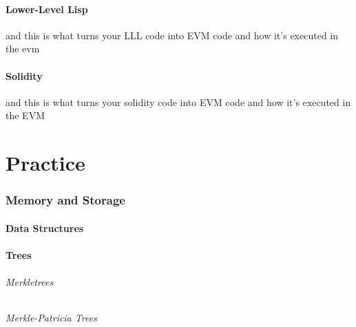 \documentclass[10pt,a4paper,leqno,bibliography=totoc]{scrartcl}
\newenvironment{alphafootnotes}
{\par\edef\savedfootnotenumber{\number\value{footnote}}
\renewcommand{\thefootnote}{\alph{footnote}}
\setcounter{footnote}{0}}
{\par\setcounter{footnote}{\savedfootnotenumber}}
\begin{document}
\begin{alphafootnotes}
\begin{multicols*}{2}
		\subsection{Lower-Level Lisp}
			and this is what turns your LLL code into EVM code and how it's executed in the evm
	
		\subsection{Solidity}
			and this is what turns your solidity code into EVM code and how it's executed in the EVM

\clearpage
\part{Practice}

	\section{Memory and Storage}
			
		\subsection{Data Structures}

			\subsection{Trees}
				\paragraph{Merkletrees}
				\paragraph{Merkle-Patricia Trees}


\end{multicols*}
\end{alphafootnotes}
\end{document}
